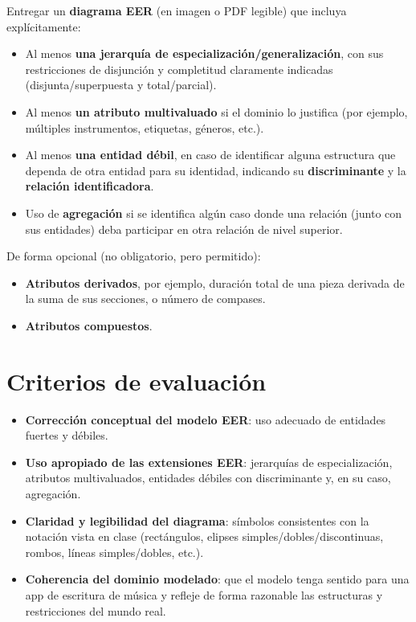 \documentclass[12pt]{article}
\begin{document}
	Entregar un \textbf{diagrama EER} (en imagen o PDF legible) que incluya explícitamente:
	\begin{itemize}
		\item Al menos \textbf{una jerarquía de especialización/generalización}, con sus restricciones de disjunción y completitud claramente indicadas (disjunta/superpuesta y total/parcial).
		\item Al menos \textbf{un atributo multivaluado} si el dominio lo justifica (por ejemplo, múltiples instrumentos, etiquetas, géneros, etc.).
		\item Al menos \textbf{una entidad débil}, en caso de identificar alguna estructura que dependa de otra entidad para su identidad, indicando su \textbf{discriminante} y la \textbf{relación identificadora}.
		\item Uso de \textbf{agregación} si se identifica algún caso donde una relación (junto con sus entidades) deba participar en otra relación de nivel superior.
	\end{itemize}
	
	De forma opcional (no obligatorio, pero permitido):
	\begin{itemize}
		\item \textbf{Atributos derivados}, por ejemplo, duración total de una pieza derivada de la suma de sus secciones, o número de compases.
		\item \textbf{Atributos compuestos}.
	\end{itemize}
	
	\section*{Criterios de evaluación}
	
	\begin{itemize}
		\item \textbf{Corrección conceptual del modelo EER}: uso adecuado de entidades fuertes y débiles.
		\item \textbf{Uso apropiado de las extensiones EER}: jerarquías de especialización, atributos multivaluados, entidades débiles con discriminante y, en su caso, agregación.
		\item \textbf{Claridad y legibilidad del diagrama}: símbolos consistentes con la notación vista en clase (rectángulos, elipses simples/dobles/discontinuas, rombos, líneas simples/dobles, etc.).
		\item \textbf{Coherencia del dominio modelado}: que el modelo tenga sentido para una app de escritura de música y refleje de forma razonable las estructuras y restricciones del mundo real.
	\end{itemize}
	
\end{document}
